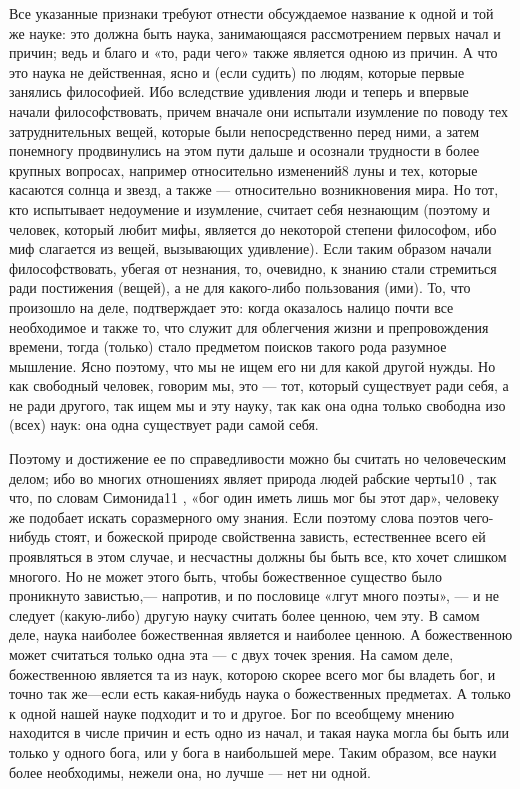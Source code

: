 \documentclass{article}
\begin{document}
Все указанные признаки требуют отнести обсуждаемое название к одной и той же науке: это должна быть наука, занимающаяся рассмотрением первых начал и причин; ведь и благо и «то, ради чего»
\footnotemark[3]
также является одною из причин. А что это наука не действенная,
\footnotemark[4]
ясно и (если судить) по людям, которые первые занялись философией. Ибо вследствие удивления люди и теперь и впервые начали философствовать, причем вначале они испытали изумление по поводу тех затруднительных вещей, которые были непосредственно перед ними, а затем понемногу продвинулись на этом пути дальше и осознали трудности в более крупных вопросах, например относительно изменений8  луны и тех, которые касаются солнца и звезд, а также — относительно возникновения мира.
\footnotemark[6]
Но тот, кто испытывает недоумение и изумление, считает себя незнающим (поэтому и человек, который любит мифы, является до некоторой степени философом, ибо миф слагается из вещей, вызывающих удивление). Если таким образом начали философствовать, убегая от незнания, то, очевидно, к знанию стали стремиться ради постижения (вещей), а не для какого-либо пользования (ими). То, что произошло на деле, подтверждает это: когда оказалось налицо почти все необходимое и также то, что служит для облегчения жизни и препровождения времени, тогда (только) стало предметом поисков такого рода разумное мышление. Ясно поэтому, что мы не ищем его ни для какой другой нужды. Но как свободный человек, говорим мы, это — тот, который существует ради себя, а не ради другого, так ищем мы и эту науку, так как она одна только свободна изо (всех) наук: она одна существует ради самой себя.

Поэтому и достижение ее по справедливости можно бы считать но человеческим делом; ибо во многих отношениях являет природа людей рабские черты10 , так что, по словам Симонида11 , «бог один иметь лишь мог бы этот дар», человеку же подобает искать соразмерного ому знания. Если поэтому слова поэтов чего-нибудь стоят, и божеской природе свойственна зависть, естественнее всего ей проявляться в этом случае, и несчастны должны бы быть все, кто хочет слишком многого. Но не может этого быть, чтобы божественное существо было проникнуто завистью,— напротив, и по пословице «лгут много поэты», — и не следует (какую-либо) другую науку считать более ценною, чем эту. В самом деле, наука наиболее божественная является и наиболее ценною. А божественною может считаться только одна эта — с двух точек зрения. На самом деле, божественною является та из наук, которою скорее всего мог бы владеть бог, и точно так же—если есть какая-нибудь наука о божественных предметах. А только к одной нашей науке подходит и то и другое. Бог по всеобщему мнению находится в числе причин и есть одно из начал, и такая наука могла бы быть или только у одного бога, или у бога в наибольшей мере. Таким образом, все науки более необходимы, нежели она, но лучше — нет ни одной.
\end{document}
